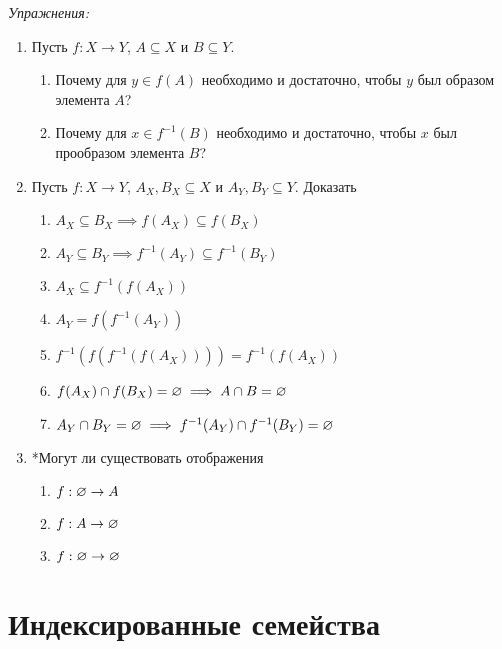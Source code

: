 {\it Упражнения:}
\begin{enumerate}
  \item{}Пусть ${f:X\to Y}$, $A\subseteq X$ и $B\subseteq Y$.
  \begin{enumerate}
    \item{}Почему для $y\in f(A)$ необходимо и достаточно,
    чтобы $y$ был образом элемента $A$?
    \item{}Почему для $x\in f^{-1}(B)$ необходимо и достаточно,
    чтобы $x$ был прообразом элемента $B$?
  \end{enumerate}
  \item{}Пусть ${f:X\to Y}$, ${A_{X},B_{X}\subseteq X}$ и
  ${A_{Y},B_{Y}\subseteq Y}$. Доказать
  \begin{fullwidth}
    \begin{multicols}{2}
      \begin{enumerate}
        \item{}$A_{X}\subseteq B_{X}\implies f(A_{X})\subseteq f(B_{X})$
        \item{}$A_{Y}\subseteq B_{Y}\implies f^{-1}(A_{Y})\subseteq f^{-1}(B_{Y})$
        \item{}$A_{X}\subseteq f^{-1}(f(A_{X}))$
        \item{}$A_{Y}=f(f^{-1}(A_{Y}))$
        \item{}$f^{-1}(f(f^{-1}(f(A_{X}))))=f^{-1}(f(A_{X}))$
        \item{}$f(A_{X})\cap f(B_{X})=\varnothing\implies A\cap B=\varnothing$
        \item{}$A_{Y}\cap B_{Y}=\varnothing\implies f^{-1}(A_{Y})\cap f^{-1}(B_{Y})=\varnothing$
      \end{enumerate}
    \end{multicols}
  \end{fullwidth}
  \item{}*Могут ли существовать отображения
  \begin{multicols}{3}
    \begin{enumerate}
      \item{}$f:\varnothing\to A$
      \item{}$f:A\to\varnothing$
      \item{}$f:\varnothing\to\varnothing$
    \end{enumerate}
  \end{multicols}
\end{enumerate}

\section{Индексированные семейства}

